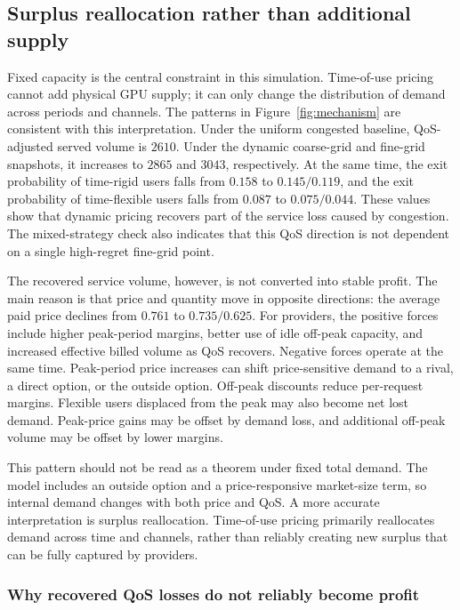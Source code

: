 \documentclass[11pt,a4paper]{article}
\begin{document}
\subsection{Surplus reallocation rather than additional supply}

Fixed capacity is the central constraint in this simulation. Time-of-use pricing cannot add physical GPU supply; it can only change the distribution of demand across periods and channels. The patterns in Figure~\ref{fig:mechanism} are consistent with this interpretation. Under the uniform congested baseline, QoS-adjusted served volume is $2610$. Under the dynamic coarse-grid and fine-grid snapshots, it increases to $2865$ and $3043$, respectively. At the same time, the exit probability of time-rigid users falls from $0.158$ to $0.145/0.119$, and the exit probability of time-flexible users falls from $0.087$ to $0.075/0.044$. These values show that dynamic pricing recovers part of the service loss caused by congestion. The mixed-strategy check also indicates that this QoS direction is not dependent on a single high-regret fine-grid point.

The recovered service volume, however, is not converted into stable profit. The main reason is that price and quantity move in opposite directions: the average paid price declines from $0.761$ to $0.735/0.625$. For providers, the positive forces include higher peak-period margins, better use of idle off-peak capacity, and increased effective billed volume as QoS recovers. Negative forces operate at the same time. Peak-period price increases can shift price-sensitive demand to a rival, a direct option, or the outside option. Off-peak discounts reduce per-request margins. Flexible users displaced from the peak may also become net lost demand. Peak-price gains may be offset by demand loss, and additional off-peak volume may be offset by lower margins.

This pattern should not be read as a theorem under fixed total demand. The model includes an outside option and a price-responsive market-size term, so internal demand changes with both price and QoS. A more accurate interpretation is surplus reallocation. Time-of-use pricing primarily reallocates demand across time and channels, rather than reliably creating new surplus that can be fully captured by providers.

\subsubsection{Why recovered QoS losses do not reliably become profit}
\end{document}
